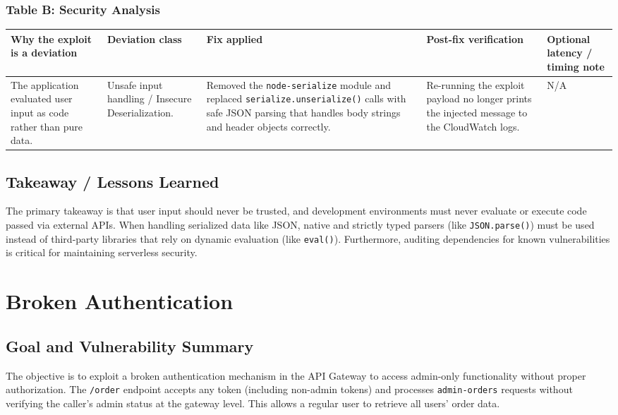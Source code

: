 \documentclass[12pt]{report}
\begin{document}
\subsection*{Table B: Security Analysis}
\begin{table}[H]
  \footnotesize
  \centering
  \begin{tabularx}{\textwidth}{|Y|Y|Y|Y|Y|}
    \hline
    \textbf{Why the exploit is a deviation} & \textbf{Deviation class} & \textbf{Fix applied} & \textbf{Post-fix verification} & \textbf{Optional latency / timing note} \\
    \hline
    The application evaluated user input as code rather than pure data. &
    Unsafe input handling / Insecure Deserialization. &
    Removed the \nolinkurl{node-serialize} module and replaced \nolinkurl{serialize.unserialize()} calls with safe JSON parsing that handles body strings and header objects correctly. &
    Re-running the exploit payload no longer prints the injected message to the CloudWatch logs. &
    N/A \\
    \hline
  \end{tabularx}
\end{table}

\section{Takeaway / Lessons Learned}
The primary takeaway is that user input should never be trusted, and development environments must never evaluate or execute code passed via external APIs. When handling serialized data like JSON, native and strictly typed parsers (like \texttt{JSON.parse()}) must be used instead of third-party libraries that rely on dynamic evaluation (like \texttt{eval()}). Furthermore, auditing dependencies for known vulnerabilities is critical for maintaining serverless security.

\clearpage

\chapter{Broken Authentication}

\section{Goal and Vulnerability Summary}
The objective is to exploit a broken authentication mechanism in the API Gateway to access admin-only functionality without proper authorization. The \texttt{/order} endpoint accepts any token (including non-admin tokens) and processes \texttt{admin-orders} requests without verifying the caller's admin status at the gateway level. This allows a regular user to retrieve all users' order data.
\end{document}
